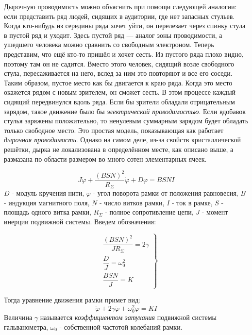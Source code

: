 \documentclass[a4paper, 12pt]{article}
\begin{document}
Дырочную проводимость можно объяснить при помощи следующей аналогии: если представить ряд людей, сидящих в аудитории, где нет запасных стульев. Когда кто-нибудь из середины ряда хочет уйти, он перелезает через спинку стула в пустой ряд и уходит. Здесь пустой ряд — аналог зоны проводимости, а ушедшего человека можно сравнить со свободным электроном.
Теперь представим, что ещё кто-то пришёл и хочет сесть. Из пустого ряда плохо видно, поэтому там он не садится. Вместо этого человек, сидящий возле свободного стула, пересаживается на него, вслед за ним это повторяют и все его соседи. Таким образом, пустое место как бы двигается к краю ряда. Когда это место окажется рядом с новым зрителем, он сможет сесть.
В этом процессе каждый сидящий передвинулся вдоль ряда. Если бы зрители обладали отрицательным зарядом, такое движение было бы  \textit{электрической проводимостью}. Если вдобавок стулья заряжены положительно, то ненулевым суммарным зарядом будет обладать только свободное место. Это простая модель, показывающая как работает \textit{дырочная проводимость}. Однако на самом деле, из-за свойств кристаллической решётки, дырка не локализована в определённом месте, как описано выше, а размазана по области размером во много сотен элементарных ячеек.


\begin{equation}
J \ddot{\varphi} + \dfrac{\left(BSN\right)^2}{R_{\Sigma}} \dot{\varphi} + D\varphi = BSNI
\end{equation}
$D$ - модуль кручения нити, $\varphi$ - угол поворота рамки от положения равновесия, $B$ - индукция магнитного поля, $N$ - число витков рамки, $I$ - ток в рамке, $S$ - площадь одного витка рамки, $R_{\Sigma}$ - полное сопротивление цепи, $J$ - момент инерции подвижной системы.
Введем обозначения:

\begin{equation}
\left.
\begin{aligned}
&\dfrac{(BSN)^2}{JR_{\Sigma}} = 2\gamma \\
&\dfrac{D}{J} = \omega_0^2 \\
&\dfrac{BSN}{J} = K 
\end{aligned}
\right\}
\end{equation}

Тогда уравнение движения рамки примет вид:
\begin{equation}
\label{eq:diff}
\ddot{\varphi} +2\gamma\dot{\varphi} + \omega_0^2 \varphi = KI
\end{equation}
Величина $\gamma$ называется \textit{коэффициентом затухания} подвижной системы гальванометра,  $\omega_0$ - собственной частотой колебаний рамки.
\end{document}

